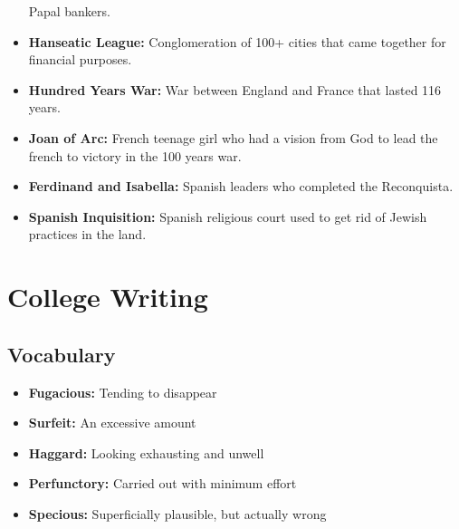 \documentclass[crop=false,class=book]{standalone}
\begin{document}
\begin{itemize}[noitemsep]
                    Papal bankers.
                \item \textbf{Hanseatic League:}
                    Conglomeration of 100+ cities that came
                    together for financial purposes.
                \item \textbf{Hundred Years War:}
                    War between England and France that lasted
                    116 years. 
                \item \textbf{Joan of Arc:}
                    French teenage girl who had a vision from
                    God to lead the french to victory in
                    the 100 years war.
                \item \textbf{Ferdinand and Isabella:}
                    Spanish leaders who completed the Reconquista.
                \item \textbf{Spanish Inquisition:}
                    Spanish religious court used to get rid of
                    Jewish practices in the land.
            \end{itemize}
    \section{College Writing}
        \subsection{Vocabulary}
            \begin{itemize}[noitemsep]
                \item \textbf{Fugacious:}
                    Tending to disappear
                \item \textbf{Surfeit:}
                    An excessive amount
                \item \textbf{Haggard:}
                    Looking exhausting and unwell
                \item \textbf{Perfunctory:}
                    Carried out with minimum effort
                \item \textbf{Specious:}
                    Superficially plausible, but actually wrong
            \end{itemize}
\end{document}
